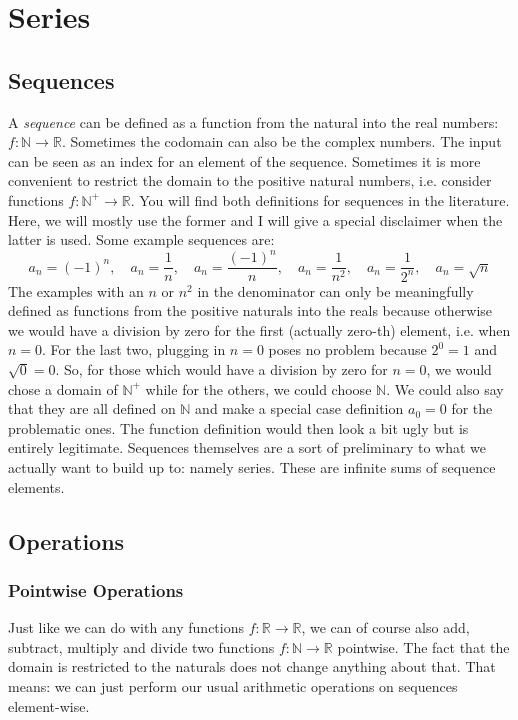 \section{Series}

\subsection{Sequences}
A \emph{sequence} can be defined as a function from the natural into the real numbers: $f: \mathbb{N} \rightarrow \mathbb{R}$. Sometimes the codomain can also be the complex numbers. The input can be seen as an index for an element of the sequence. Sometimes it is more convenient to restrict the domain to the positive natural numbers, i.e. consider functions $f: \mathbb{N}^+ \rightarrow \mathbb{R}$. You will find both definitions for sequences in the literature. Here, we will mostly use the former and I will give a special disclaimer when the latter is used. Some example sequences are:
\begin{equation}
 a_n = (-1)^n,           \quad 
 a_n = \frac{1}{n},      \quad
 a_n = \frac{(-1)^n}{n}, \quad 
 a_n = \frac{1}{n^2},    \quad
 a_n = \frac{1}{2^n},    \quad  
 a_n = \sqrt{n}
\end{equation}
The examples with an $n$ or $n^2$ in the denominator can only be meaningfully defined as functions from the positive naturals into the reals because otherwise we would have a division by zero for the first (actually zero-th) element, i.e. when $n=0$. For the last two, plugging in $n=0$ poses no problem because $2^0=1$ and $\sqrt{0} = 0$. So, for those which would have a division by zero for $n=0$, we would chose a domain of $\mathbb{N}^+$ while for the others, we could choose $\mathbb{N}$. We could also say that they are all defined on $\mathbb{N}$ and make a special case definition $a_0 = 0$ for the problematic ones. The function definition would then look a bit ugly but is entirely legitimate. Sequences themselves are a sort of preliminary to what we actually want to build up to: namely series. These are infinite sums of sequence elements.


\subsection{Operations}

\subsubsection{Pointwise Operations}
Just like we can do with any functions $f: \mathbb{R} \rightarrow \mathbb{R}$, we can of course also add, subtract, multiply and divide two functions $f: \mathbb{N} \rightarrow \mathbb{R}$ pointwise. The fact that the domain is restricted to the naturals does not change anything about that. That means: we can just perform our usual arithmetic operations on sequences element-wise.

